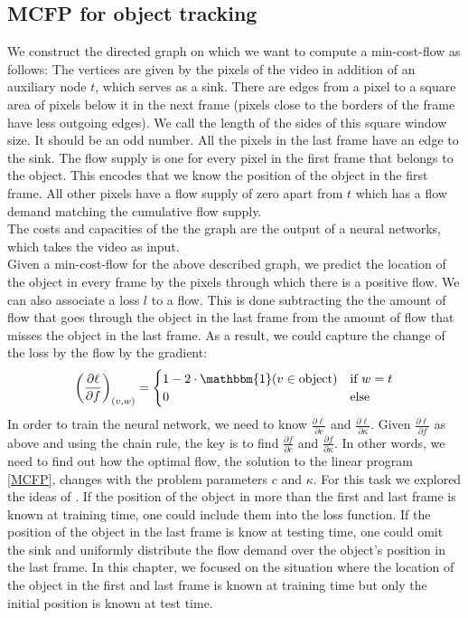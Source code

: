 \documentclass{article}
\begin{document}
\subsection{MCFP for object tracking}\label{MCFP for tracking}
We construct the directed graph on which we want to compute a min-cost-flow as follows: The vertices are given by the pixels of the video in addition of an auxiliary node $t$, which serves as a sink. There are edges from a pixel to a square area of pixels below it in the next frame (pixels close to the borders of the frame have less outgoing edges). We call the length of the sides of this square window size. It should be an odd number. All the pixels in the last frame have an edge to the sink. The flow supply is one for every pixel in the first frame that belongs to the object. This encodes that we know the position of the object in the first frame. All other pixels have a flow supply of zero apart from $t$ which has a flow demand matching the cumulative flow supply.\\
The costs and capacities of the the graph are the output of a neural networks, which takes the video as input. \\
Given a min-cost-flow for the above described graph, we predict the location of the object in every frame by the pixels through which there is a positive flow. We can also associate a loss $l$ to a flow. This is done subtracting the the amount of flow that goes through the object in the last frame from the amount of flow that misses the object in the last frame. As a result, we could capture the change of the loss by the flow by the gradient:
\begin{align}\label{loss}
\left(\frac{\partial \ell}{\partial f}\right)_{(v,w)} = 
\begin{cases}
 1-2\cdot\mathbbm{1}( v\in\textnormal{object}) &\text{if } w = t\\
 0 &\text{else}
\end{cases}
\end{align}
In order to train the neural network, we need to know $\frac{\partial \ell}{\partial c}$ and $\frac{\partial \ell}{\partial\kappa}$. Given $\frac{\partial \ell}{\partial f}$ as above and using the chain rule, the key is to find $\frac{\partial f}{\partial c}$ and $\frac{\partial f}{\partial \kappa}$. In other words, we need to find out how the optimal flow, the solution to the linear program \ref{MCFP}, changes with the problem parameters $c$ and $\kappa$. For this task we explored the ideas of \cite{AmosK17}. If the position of the object in more than the first and last frame is known at training time, one could include them into the loss function. If the position of the object in the last frame is know at testing time, one could omit the sink and uniformly distribute the flow demand over the object's position in the last frame. In this chapter, we focused on the situation where the location of the object in the first and last frame is known at training time but only the initial position is known at test time.
\end{document}
